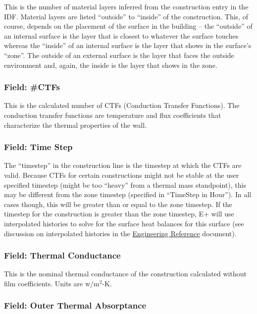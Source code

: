 This is the number of material layers inferred from the construction entry in the IDF. Material layers are listed ``outside'' to ``inside'' of the construction. This, of course, depends on the placement of the surface in the building -- the ``outside'' of an internal surface is the layer that is closest to whatever the surface touches whereas the ``inside'' of an internal surface is the layer that shows in the surface's ``zone''. The outside of an external surface is the layer that faces the outside environment and, again, the inside is the layer that shows in the zone.

\subsubsection{Field: \#CTFs}\label{field-ctfs}

This is the calculated number of CTFs (Conduction Transfer Functions). The conduction transfer functions are temperature and flux coefficients that characterize the thermal properties of the wall.

\subsubsection{Field: Time Step}\label{field-time-step}

The ``timestep'' in the construction line is the timestep at which the CTFs are valid. Because CTFs for certain constructions might not be stable at the user specified timestep (might be too ``heavy'' from a thermal mass standpoint), this may be different from the zone timestep (specified in ``TimeStep in Hour''). In all cases though, this will be greater than or equal to the zone timestep. If the timestep for the construction is greater than the zone timestep, E+ will use interpolated histories to solve for the surface heat balances for this surface (see discussion on interpolated histories in the \href{https://energyplus.readthedocs.io/en/latest/guides/engineering-reference/index.html}{Engineering Reference} document).

\subsubsection{Field: Thermal Conductance}\label{field-thermal-conductance}

This is the nominal thermal conductance of the construction calculated without film coefficients. Units are w/m\(^{2}\)-K.

\subsubsection{Field: Outer Thermal Absorptance}\label{field-outer-thermal-absorptance}

